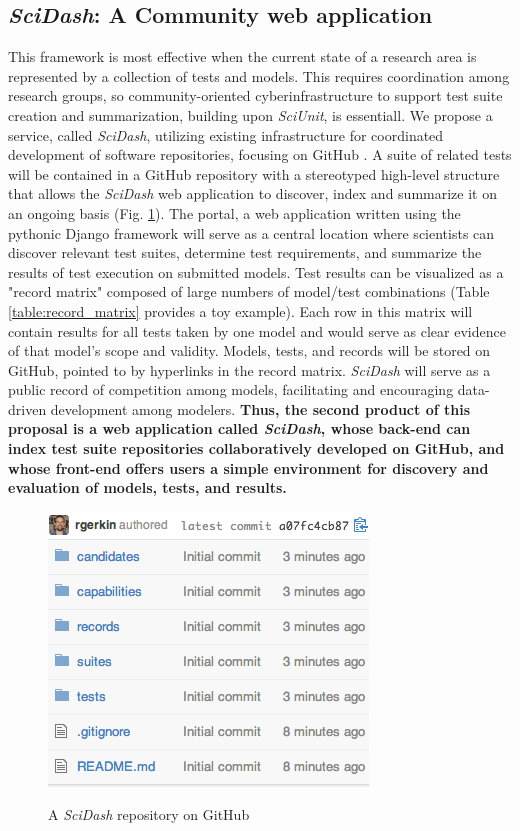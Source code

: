 \documentclass[11pt,letterpaper]{article}
\begin{document}
\subsection{\textit{SciDash}: A Community web application}
This framework is most effective when the current state of a research area is represented by a collection of tests and models. This requires coordination among research groups, so community-oriented cyberinfrastructure to support test suite creation and summarization, building upon \textit{SciUnit}, is essentiall. We propose a service, called \textit{SciDash}, utilizing existing infrastructure for coordinated development of software repositories, focusing on GitHub \cite{github_url} \cite{ram_git_2013}. A suite of related tests will be contained in a GitHub repository with a stereotyped high-level structure that allows the \textit{SciDash} web application to discover, index and summarize it on an ongoing basis (Fig. \ref{fig:scidash_repo}). The portal, a web application written using the pythonic Django framework \cite{django_url} will serve as a central location where scientists can discover relevant test suites, determine test requirements, and summarize the results of test execution on submitted models. Test results can be visualized as a "record matrix" composed of large numbers of model/test combinations (Table \ref{table:record_matrix} provides a toy example).  Each row in this matrix will contain results for all tests taken by one model and would serve as clear evidence of that model's scope and validity.  Models, tests, and records will be stored on GitHub, pointed to by hyperlinks in the record matrix. \textit{SciDash} will serve as a public record of competition among models, facilitating and encouraging data-driven development among modelers. \textbf{Thus, the second product of this proposal is a web application called \textit{SciDash}, whose back-end can index test suite repositories collaboratively developed on GitHub, and whose front-end offers users a simple environment for discovery and evaluation of models, tests, and results.}  

\begin{figure}
\centering
\includegraphics[scale=0.7]{scidash_github.png}
\label{fig:scidash_repo}
\caption{A \textit{SciDash} repository on GitHub}
\end{figure}
\leavevmode
{}    
\end{document}
